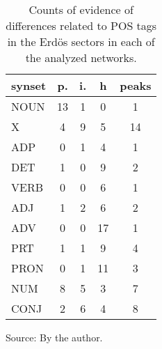 \begin{table}[h!]
\begin{center}
\caption{Counts of evidence of differences related to POS tags in the Erd\"os sectors in each of the analyzed networks.}
\begin{tabular}{| l || c | c | c || c |}\hline
{\bf synset} & {\bf p.} & {\bf i.} & {\bf h} & {\bf peaks} \\\hline\hline
NOUN & 13  & 1  & 0  & 1 \\
X & 4  & 9  & 5  & 14 \\\hline
ADP & 0  & 1  & 4  & 1 \\
DET & 1  & 0  & 9  & 2 \\\hline
VERB & 0  & 0  & 6  & 1 \\\hline
ADJ & 1  & 2  & 6  & 2 \\
ADV & 0  & 0  & 17  & 1 \\\hline
PRT & 1  & 1  & 9  & 4 \\
PRON & 0  & 1  & 11  & 3 \\
NUM & 8  & 5  & 3  & 7 \\
CONJ & 2  & 6  & 4  & 8 \\\hline
\end{tabular}
\begin{flushleft}\footnotesize
		Source: By the author.\
\end{flushleft}
\end{center}
\end{table}
